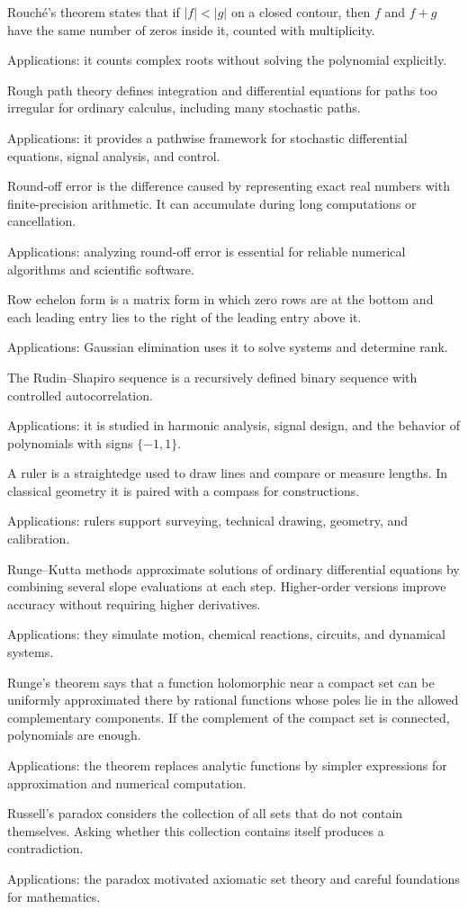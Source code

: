 Rouché's theorem states that if $|f|<|g|$ on a closed contour, then $f$ and $f+g$ have the same number of zeros inside it, counted with multiplicity. \par\noindent Applications: it counts complex roots without solving the polynomial explicitly.

Rough path theory defines integration and differential equations for paths too irregular for ordinary calculus, including many stochastic paths. \par\noindent Applications: it provides a pathwise framework for stochastic differential equations, signal analysis, and control.

Round-off error is the difference caused by representing exact real numbers with finite-precision arithmetic. It can accumulate during long computations or cancellation. \par\noindent Applications: analyzing round-off error is essential for reliable numerical algorithms and scientific software.

Row echelon form is a matrix form in which zero rows are at the bottom and each leading entry lies to the right of the leading entry above it. \par\noindent Applications: Gaussian elimination uses it to solve systems and determine rank.

The Rudin--Shapiro sequence is a recursively defined binary sequence with controlled autocorrelation. \par\noindent Applications: it is studied in harmonic analysis, signal design, and the behavior of polynomials with signs $\{-1,1\}$.

A ruler is a straightedge used to draw lines and compare or measure lengths. In classical geometry it is paired with a compass for constructions. \par\noindent Applications: rulers support surveying, technical drawing, geometry, and calibration.

Runge--Kutta methods approximate solutions of ordinary differential equations by combining several slope evaluations at each step. Higher-order versions improve accuracy without requiring higher derivatives. \par\noindent Applications: they simulate motion, chemical reactions, circuits, and dynamical systems.

Runge's theorem says that a function holomorphic near a compact set can be uniformly approximated there by rational functions whose poles lie in the allowed complementary components. If the complement of the compact set is connected, polynomials are enough. \par\noindent Applications: the theorem replaces analytic functions by simpler expressions for approximation and numerical computation.

Russell's paradox considers the collection of all sets that do not contain themselves. Asking whether this collection contains itself produces a contradiction. \par\noindent Applications: the paradox motivated axiomatic set theory and careful foundations for mathematics.
